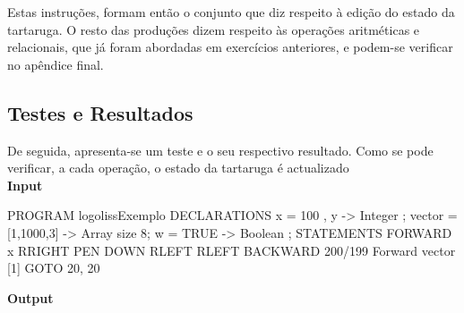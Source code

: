 \documentclass[11pt,a4paper]{article}
\begin{document}

Estas instruções, formam então o conjunto que diz respeito à edição do estado da tartaruga. O resto das produções dizem respeito às operações aritméticas e relacionais, que já foram 
abordadas em exercícios anteriores, e podem-se verificar no apêndice final.

\subsection{Testes e Resultados}
De seguida, apresenta-se um teste e o seu respectivo resultado. Como se pode verificar, a cada operação, o estado da tartaruga é actualizado\\

\textbf{Input}\\

\begin{code_txt}
PROGRAM logolissExemplo {
DECLARATIONS
x = 100 , y -> Integer ;
vector = [1,1000,3] -> Array size 8;
w = TRUE -> Boolean ;
STATEMENTS
FORWARD x
RRIGHT
PEN DOWN
RLEFT
RLEFT
BACKWARD 200/199
Forward vector [1]
GOTO 20, 20
} 
\end{code_txt}

\textbf{Output}\\
\end{document}
